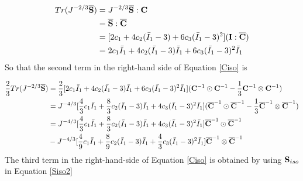 \begin{equation}
\begin{split}
Tr(J^{-2/3}\overline{\bold{S}}) &= J^{-2/3}\overline{\bold{S}}:\bold{C} \\
&= \overline{\bold{S}} : \overline{\bold{C}} \\
&=  [2c_1 + 4c_2(\bar{I}_1 - 3) + 6c_3(\bar{I}_1 - 3)^2] (\bold{I} : \overline{\bold{C}}) \\
&= 2c_1\bar{I}_1 + 4c_2(\bar{I_1} - 3)\bar{I}_1 + 6c_3(\bar{I}_1 - 3)^2\bar{I}_1
\end{split}
\end{equation}
So that the second term in the right-hand side of Equation \ref{Ciso} is

\begin{equation} \label{part22}
\begin{split}
\frac{2}{3}Tr(J^{-2/3}\overline{\bold{S}})
&= \frac{2}{3} [2c_1\bar{I}_1 + 4c_2(\bar{I_1} - 3)\bar{I}_1 + 6c_3(\bar{I_1} - 3)^2\bar{I}_1] ({{\bold{C}}}^{-1} \odot {{\bold{C}}}^{-1} - \frac{1}{3}{{\bold{C}}}^{-1} \otimes {{\bold{C}}}^{-1}) \\
&= J^{-4/3}[\frac{4}{3}c_1{\bar{I}}_1 + \frac{8}{3}c_2({\bar{I}}_1 - 3){\bar{I}}_1 + 4c_3({\bar{I}}_1 - 3)^2{\bar{I}}_1]({\overline{\bold{C}}}^{-1} \odot {\overline{\bold{C}}}^{-1} - \frac{1}{3}{\overline{\bold{C}}}^{-1} \otimes {\overline{\bold{C}}}^{-1}) \\
&= J^{-4/3} [\frac{4}{3}c_1{\bar{I}}_1 + \frac{8}{3}c_2({\bar{I}}_1 - 3){\bar{I}}_1 + 4c_3({\bar{I}}_1 - 3)^2{\bar{I}}_1]{\overline{\bold{C}}}^{-1} \odot {\overline{\bold{C}}}^{-1} \\
&-  J^{-4/3}[\frac{4}{9}c_1{\bar{I}}_1 + \frac{8}{9}c_2({\bar{I}}_1 - 3){\bar{I}}_1 + \frac{4}{3}c_3({\bar{I}}_1 - 3)^2{\bar{I}}_1]{\overline{\bold{C}}}^{-1} \otimes {\overline{\bold{C}}}^{-1} 
\end{split}
\end{equation}
The third term in the right-hand-side of Equation \ref{Ciso} is obtained by using $\bold{S}_{iso}$ in Equation \ref{Siso2}

